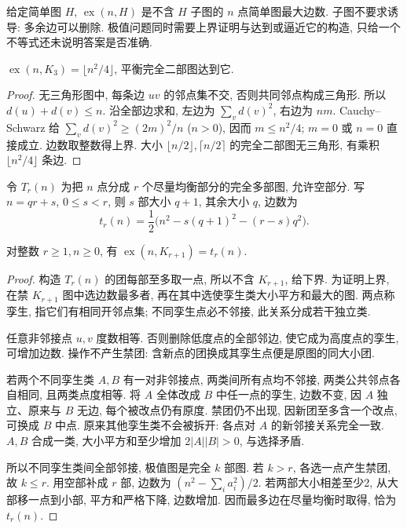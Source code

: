 \label{ch:extremal}
给定简单图 $H$, $\operatorname{ex}(n,H)$ 是不含 $H$ 子图的 $n$ 点简单图最大边数. 子图不要求诱导: 多余边可以删除. 极值问题同时需要上界证明与达到或逼近它的构造, 只给一个不等式还未说明答案是否准确.
\begin{theorem}[Mantel]\label{thm:mantel}
$\operatorname{ex}(n,K_3)=\lfloor n^2/4\rfloor$, 平衡完全二部图达到它.
\end{theorem}
\begin{proof}
无三角形图中, 每条边 $uv$ 的邻点集不交, 否则共同邻点构成三角形. 所以 $d(u)+d(v)\le n$. 沿全部边求和, 左边为 $\sum_vd(v)^2$, 右边为 $nm$. Cauchy--Schwarz 给 $\sum_vd(v)^2\ge(2m)^2/n$ ($n>0$), 因而 $m\le n^2/4$; $m=0$ 或 $n=0$ 直接成立. 边数取整数得上界. 大小 $\lfloor n/2\rfloor,\lceil n/2\rceil$ 的完全二部图无三角形, 有乘积 $\lfloor n^2/4\rfloor$ 条边.
\end{proof}
令 $T_r(n)$ 为把 $n$ 点分成 $r$ 个尽量均衡部分的完全多部图, 允许空部分. 写 $n=qr+s$, $0\le s<r$, 则 $s$ 部大小 $q+1$, 其余大小 $q$, 边数为
\[
t_r(n)=\frac12\bigl(n^2-s(q+1)^2-(r-s)q^2\bigr).
\]
\begin{theorem}[Turán]\label{thm:turan}
对整数 $r\ge1,n\ge0$, 有 $\operatorname{ex}(n,K_{r+1})=t_r(n)$.
\end{theorem}
\begin{proof}
构造 $T_r(n)$ 的团每部至多取一点, 所以不含 $K_{r+1}$, 给下界. 为证明上界, 在禁 $K_{r+1}$ 图中选边数最多者, 再在其中选使孪生类大小平方和最大的图. 两点称孪生, 指它们有相同开邻点集; 不同孪生点必不邻接, 此关系分成若干独立类.

任意非邻接点 $u,v$ 度数相等. 否则删除低度点的全部邻边, 使它成为高度点的孪生, 可增加边数. 操作不产生禁团: 含新点的团换成其孪生点便是原图的同大小团.

若两个不同孪生类 $A,B$ 有一对非邻接点, 两类间所有点均不邻接, 两类公共邻点各自相同, 且两类点度相等. 将 $A$ 全体改成 $B$ 中任一点的孪生, 边数不变, 因 $A$ 独立、原来与 $B$ 无边, 每个被改点仍有原度. 禁团仍不出现, 因新团至多含一个改点, 可换成 $B$ 中点. 原来其他孪生类不会被拆开: 各点对 $A$ 的新邻接关系完全一致. $A,B$ 合成一类, 大小平方和至少增加 $2|A||B|>0$, 与选择矛盾.

所以不同孪生类间全部邻接, 极值图是完全 $k$ 部图. 若 $k>r$, 各选一点产生禁团, 故 $k\le r$. 用空部补成 $r$ 部, 边数为 $(n^2-\sum_i a_i^2)/2$. 若两部大小相差至少2, 从大部移一点到小部, 平方和严格下降, 边数增加. 因而最多边在尽量均衡时取得, 恰为 $t_r(n)$.
\end{proof}
